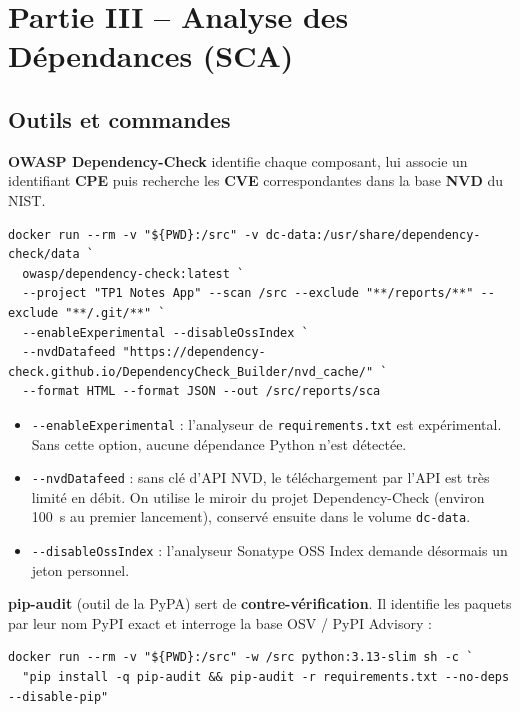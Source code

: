 \documentclass[11pt,a4paper]{article}
\newcommand{\code}[1]{\texttt{#1}}
\begin{document}
\section{Partie III -- Analyse des Dépendances (SCA)}
\subsection{Outils et commandes}
\textbf{OWASP Dependency-Check} identifie chaque composant, lui associe un identifiant
\textbf{CPE} puis recherche les \textbf{CVE} correspondantes dans la base \textbf{NVD} du NIST.

\begin{lstlisting}[caption={Lancement d'OWASP Dependency-Check}]
docker run --rm -v "${PWD}:/src" -v dc-data:/usr/share/dependency-check/data `
  owasp/dependency-check:latest `
  --project "TP1 Notes App" --scan /src --exclude "**/reports/**" --exclude "**/.git/**" `
  --enableExperimental --disableOssIndex `
  --nvdDatafeed "https://dependency-check.github.io/DependencyCheck_Builder/nvd_cache/" `
  --format HTML --format JSON --out /src/reports/sca
\end{lstlisting}

\begin{itemize}
  \item \code{-{}-enableExperimental} : l'analyseur de \code{requirements.txt} est expérimental.
        Sans cette option, aucune dépendance Python n'est détectée.
  \item \code{-{}-nvdDatafeed} : sans clé d'API NVD, le téléchargement par l'API est très limité en
        débit. On utilise le miroir du projet Dependency-Check (environ 100~s au premier lancement),
        conservé ensuite dans le volume \code{dc-data}.
  \item \code{-{}-disableOssIndex} : l'analyseur Sonatype OSS Index demande désormais un jeton personnel.
\end{itemize}

\textbf{pip-audit} (outil de la PyPA) sert de \textbf{contre-vérification}. Il identifie les
paquets par leur nom PyPI exact et interroge la base OSV / PyPI Advisory :

\begin{lstlisting}[caption={Lancement de pip-audit}]
docker run --rm -v "${PWD}:/src" -w /src python:3.13-slim sh -c `
  "pip install -q pip-audit && pip-audit -r requirements.txt --no-deps --disable-pip"
\end{lstlisting}
\end{document}
